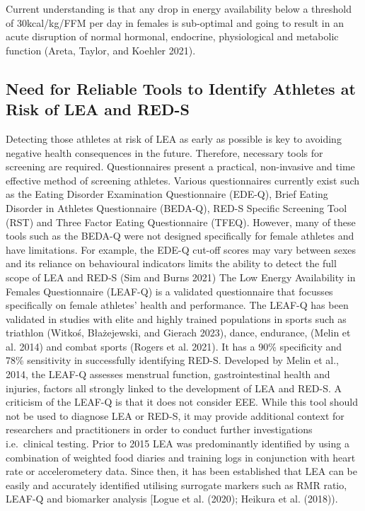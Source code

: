 \documentclass[
]{article}
\begin{document}
Current understanding is that any drop in energy availability below a threshold of 30kcal/kg/FFM per day in females is sub-optimal and going to result in an acute disruption of normal hormonal, endocrine, physiological and metabolic function (Areta, Taylor, and Koehler 2021).

\subsection{Need for Reliable Tools to Identify Athletes at Risk of LEA and RED-S}\label{need-for-reliable-tools-to-identify-athletes-at-risk-of-lea-and-red-s}

Detecting those athletes at risk of LEA as early as possible is key to avoiding negative health consequences in the future. Therefore, necessary tools for screening are required. Questionnaires present a practical, non-invasive and time effective method of screening athletes. Various questionnaires currently exist such as the Eating Disorder Examination Questionnaire (EDE-Q), Brief Eating Disorder in Athletes Questionnaire (BEDA-Q), RED-S Specific Screening Tool (RST) and Three Factor Eating Questionnaire (TFEQ). However, many of these tools such as the BEDA-Q were not designed specifically for female athletes and have limitations. For example, the EDE-Q cut-off scores may vary between sexes and its reliance on behavioural indicators limits the ability to detect the full scope of LEA and RED-S (Sim and Burns 2021) The Low Energy Availability in Females Questionnaire (LEAF-Q) is a validated questionnaire that focusses specifically on female athletes' health and performance. The LEAF-Q has been validated in studies with elite and highly trained populations in sports such as triathlon (Witkoś, Błażejewski, and Gierach 2023), dance, endurance, (Melin et al. 2014) and combat sports (Rogers et al. 2021). It has a 90\% specificity and 78\% sensitivity in successfully identifying RED-S. Developed by Melin et al., 2014, the LEAF-Q assesses menstrual function, gastrointestinal health and injuries, factors all strongly linked to the development of LEA and RED-S. A criticism of the LEAF-Q is that it does not consider EEE. While this tool should not be used to diagnose LEA or RED-S, it may provide additional context for researchers and practitioners in order to conduct further investigations i.e.~clinical testing. Prior to 2015 LEA was predominantly identified by using a combination of weighted food diaries and training logs in conjunction with heart rate or accelerometery data. Since then, it has been established that LEA can be easily and accurately identified utilising surrogate markers such as RMR ratio, LEAF-Q and biomarker analysis {[}Logue et al. (2020); Heikura et al. (2018)).
\end{document}
